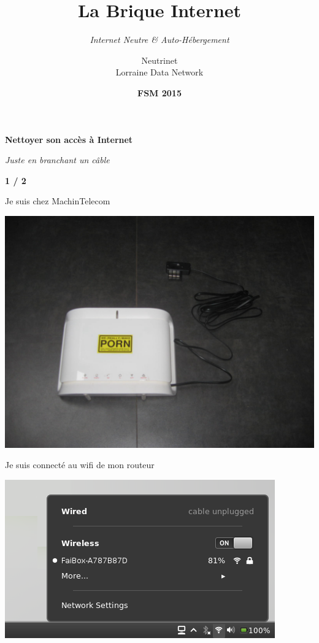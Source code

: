 \documentclass[notes=hide]{beamer}
\date{\textbf{FSM 2015}}
\title{La Brique Internet}
\subtitle{\vspace{10pt}\emph{Internet Neutre \& Auto-Hébergement}}
\author{Neutrinet \\ Lorraine Data Network}
\begin{document}
\begin{frame}[t,plain]
\titlepage
\end{frame}

\watermarkon
\watermarkoff

\begin{frame}[t]{}
\begin{center}
\vfill
{\Huge \textbf{Nettoyer son accès à Internet}}
\vspace{.5cm}

{\large \emph{Juste en branchant un câble}}
\vspace{1cm}

\textbf{1 / 2}
\vfill
\end{center}
\end{frame}

\begin{frame}[t]{Je suis chez MachinTelecom}
\begin{center}
\vfill
\includegraphics[width=.75\textwidth]{img/01-photo-neufbox.jpg}
\vfill
\end{center}
\end{frame}

\begin{frame}[t]{Je suis connecté au wifi de mon routeur}
\begin{center}
\vfill
\includegraphics[width=.9\textwidth]{img/02-capture-wifibox.png}
\vfill
\end{center}
\end{frame}
\end{document}
